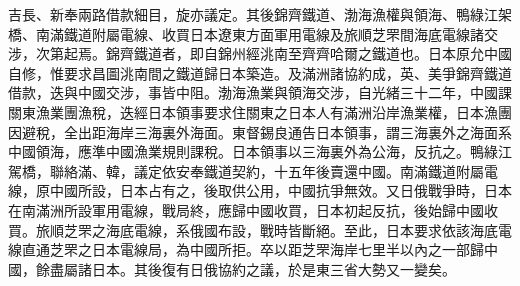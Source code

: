 \begin{pinyinscope}
吉長、新奉兩路借款細目，旋亦議定。其後錦齊鐵道、渤海漁權與領海、鴨綠江架橋、南滿鐵道附屬電線、收買日本遼東方面軍用電線及旅順芝罘間海底電線諸交涉，次第起焉。錦齊鐵道者，即自錦州經洮南至齊齊哈爾之鐵道也。日本原允中國自修，惟要求昌圖洮南間之鐵道歸日本築造。及滿洲諸協約成，英、美爭錦齊鐵道借款，迭與中國交涉，事皆中阻。渤海漁業與領海交涉，自光緒三十二年，中國課關東漁業團漁稅，迭經日本領事要求住關東之日本人有滿洲沿岸漁業權，日本漁團因避稅，全出距海岸三海裏外海面。東督錫良通告日本領事，謂三海裏外之海面系中國領海，應準中國漁業規則課稅。日本領事以三海裏外為公海，反抗之。鴨綠江駕橋，聯絡滿、韓，議定依安奉鐵道契約，十五年後賣還中國。南滿鐵道附屬電線，原中國所設，日本占有之，後取供公用，中國抗爭無效。又日俄戰爭時，日本在南滿洲所設軍用電線，戰局終，應歸中國收買，日本初起反抗，後始歸中國收買。旅順芝罘之海底電線，系俄國布設，戰時皆斷絕。至此，日本要求依該海底電線直通芝罘之日本電線局，為中國所拒。卒以距芝罘海岸七里半以內之一部歸中國，餘盡屬諸日本。其後復有日俄協約之議，於是東三省大勢又一變矣。


\end{pinyinscope}